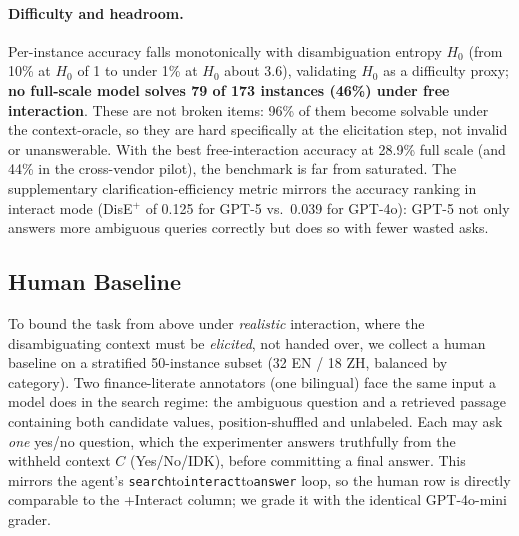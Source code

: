 \paragraph{Difficulty and headroom.} Per-instance accuracy falls monotonically
with disambiguation entropy $H_0$ (from 10\% at $H_0$ of 1 to under 1\% at
$H_0$ about 3.6), validating $H_0$ as a difficulty proxy; \textbf{no full-scale model
solves 79 of 173 instances (46\%) under free interaction}. These are not broken items:
96\% of them become solvable under the context-oracle, so they are hard specifically at
the elicitation step, not invalid or unanswerable. With the best free-interaction accuracy
at 28.9\% full scale (and 44\% in the cross-vendor pilot), the benchmark is far from
saturated. The supplementary clarification-efficiency
metric mirrors the accuracy ranking in interact mode (DisE$^+$ of 0.125 for GPT-5
vs.\ 0.039 for GPT-4o): GPT-5 not only answers more ambiguous queries correctly
but does so with fewer wasted asks.

\subsection{Human Baseline}
\label{sec:humanbaseline}

To bound the task from above under \emph{realistic} interaction, where the
disambiguating context must be \emph{elicited}, not handed over, we collect a
human baseline on a stratified 50-instance subset (32 EN / 18 ZH, balanced by
category). Two finance-literate annotators (one bilingual) face the same input a
model does in the search regime: the ambiguous question and a retrieved passage
containing both candidate values, position-shuffled and unlabeled. Each may ask
\emph{one} yes/no question, which the experimenter answers truthfully from the
withheld context $C$ (Yes/No/IDK), before committing a final answer. This mirrors
the agent's \texttt{search}to\texttt{interact}to\texttt{answer} loop, so the
human row is directly comparable to the +Interact column; we grade it with the
identical GPT-4o-mini grader.

